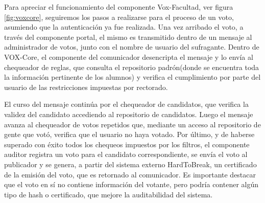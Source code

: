 Para apreciar el funcionamiento del componente Vox-Facultad, ver figura \ref{fig:voxcore}, seguiremos los pasos a realizarse para el proceso de un voto, asumiendo que la autenticación ya fue realizada. Una vez arribado el voto, a través del componente portal, el mismo es transmitido dentro de un mensaje al administrador de votos, junto con el nombre de usuario del sufragante. Dentro de VOX-Core, el componente del comunicador desencripta el mensaje y lo envía al chequeador de reglas, que consulta el repositorio padrón(donde se encuentra toda la información pertinente de los alumnos) y verifica el cumplimiento por parte del usuario de las restricciones impuestas por rectorado.

El curso del mensaje continúa por el chequeador de candidatos, que verifica la validez del candidato accediendo al repositorio de candidatos.
Luego el mensaje avanza al chequeador de votos repetidos que, mediante un acceso al repositorio de gente que votó, verifica que el usuario no haya votado.
Por último, y de haberse superado con éxito todos los chequeos impuestos por los filtros, el componente auditor registra un voto para el candidato correspondiente, se envía el voto al publicador y se genera, a partir del sistema externo HardToBreak, un certificado de la emisión del voto, que es retornado al comunicador. Es importante destacar que el voto en sí no contiene información del votante, pero podría contener algún tipo de hash o certificado, que mejore la auditabilidad del sistema. 
 
